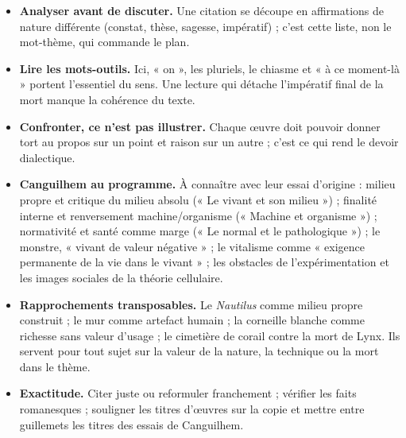 \documentclass[11pt,a4paper]{article}
\providecommand{\tightlist}{\setlength{\itemsep}{0pt}\setlength{\parskip}{0pt}}
\begin{document}
\begin{itemize}
\tightlist
\item
  \textbf{Analyser avant de discuter.} Une citation se découpe en affirmations de nature différente (constat, thèse, sagesse, impératif) ; c'est cette liste, non le mot-thème, qui commande le plan.
\item
  \textbf{Lire les mots-outils.} Ici, « on », les pluriels, le chiasme et « à ce moment-là » portent l'essentiel du sens. Une lecture qui détache l'impératif final de la mort manque la cohérence du texte.
\item
  \textbf{Confronter, ce n'est pas illustrer.} Chaque œuvre doit pouvoir donner tort au propos sur un point et raison sur un autre ; c'est ce qui rend le devoir dialectique.
\item
  \textbf{Canguilhem au programme.} À connaître avec leur essai d'origine : milieu propre et critique du milieu absolu (« Le vivant et son milieu ») ; finalité interne et renversement machine/organisme (« Machine et organisme ») ; normativité et santé comme marge (« Le normal et le pathologique ») ; le monstre, « vivant de valeur négative » ; le vitalisme comme « exigence permanente de la vie dans le vivant » ; les obstacles de l'expérimentation et les images sociales de la théorie cellulaire.
\item
  \textbf{Rapprochements transposables.} Le \emph{Nautilus} comme milieu propre construit ; le mur comme artefact humain ; la corneille blanche comme richesse sans valeur d'usage ; le cimetière de corail contre la mort de Lynx. Ils servent pour tout sujet sur la valeur de la nature, la technique ou la mort dans le thème.
\item
  \textbf{Exactitude.} Citer juste ou reformuler franchement ; vérifier les faits romanesques ; souligner les titres d'œuvres sur la copie et mettre entre guillemets les titres des essais de Canguilhem.
\end{itemize}
\end{document}
